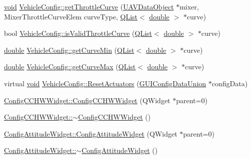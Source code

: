 \begin{DoxyCompactItemize}
\item 
\hyperlink{group___u_a_v_objects_plugin_ga444cf2ff3f0ecbe028adce838d373f5c}{void} \hyperlink{group___config_plugin_ga281f6c86ad38eaab7bb5722f91ea2242}{Vehicle\-Config\-::get\-Throttle\-Curve} (\hyperlink{class_u_a_v_data_object}{U\-A\-V\-Data\-Object} $\ast$mixer, Mixer\-Throttle\-Curve\-Elem curve\-Type, \hyperlink{class_q_list}{Q\-List}$<$ \hyperlink{_super_l_u_support_8h_a8956b2b9f49bf918deed98379d159ca7}{double} $>$ $\ast$curve)
\item 
bool \hyperlink{group___config_plugin_ga92da8cda852e8b2f1974cac57fbaa99f}{Vehicle\-Config\-::is\-Valid\-Throttle\-Curve} (\hyperlink{class_q_list}{Q\-List}$<$ \hyperlink{_super_l_u_support_8h_a8956b2b9f49bf918deed98379d159ca7}{double} $>$ $\ast$curve)
\item 
\hyperlink{_super_l_u_support_8h_a8956b2b9f49bf918deed98379d159ca7}{double} \hyperlink{group___config_plugin_gae535c3bae8862f72e05f9247a3921b78}{Vehicle\-Config\-::get\-Curve\-Min} (\hyperlink{class_q_list}{Q\-List}$<$ \hyperlink{_super_l_u_support_8h_a8956b2b9f49bf918deed98379d159ca7}{double} $>$ $\ast$curve)
\item 
\hyperlink{_super_l_u_support_8h_a8956b2b9f49bf918deed98379d159ca7}{double} \hyperlink{group___config_plugin_ga7d87a7cb73a87543dc94b23e4e4132d8}{Vehicle\-Config\-::get\-Curve\-Max} (\hyperlink{class_q_list}{Q\-List}$<$ \hyperlink{_super_l_u_support_8h_a8956b2b9f49bf918deed98379d159ca7}{double} $>$ $\ast$curve)
\item 
virtual \hyperlink{group___u_a_v_objects_plugin_ga444cf2ff3f0ecbe028adce838d373f5c}{void} \hyperlink{group___config_plugin_ga583ace2f123682515cbed3f87bd6e9fc}{Vehicle\-Config\-::\-Reset\-Actuators} (\hyperlink{union_g_u_i_config_data_union}{G\-U\-I\-Config\-Data\-Union} $\ast$config\-Data)
\item 
\hyperlink{group___config_plugin_ga7310551f62aff69c196b77b2680efb6b}{Config\-C\-C\-H\-W\-Widget\-::\-Config\-C\-C\-H\-W\-Widget} (Q\-Widget $\ast$parent=0)
\item 
\hyperlink{group___config_plugin_gaf57cdaf6ac0ff3096be01bbe4e6eea2b}{Config\-C\-C\-H\-W\-Widget\-::$\sim$\-Config\-C\-C\-H\-W\-Widget} ()
\item 
\hyperlink{group___config_plugin_ga56d10f1f43df3e0490f765a0e36eba72}{Config\-Attitude\-Widget\-::\-Config\-Attitude\-Widget} (Q\-Widget $\ast$parent=0)
\item 
\hyperlink{group___config_plugin_ga6a068a00a4c75c776ee941255797e705}{Config\-Attitude\-Widget\-::$\sim$\-Config\-Attitude\-Widget} ()

\end{DoxyCompactItemize}
